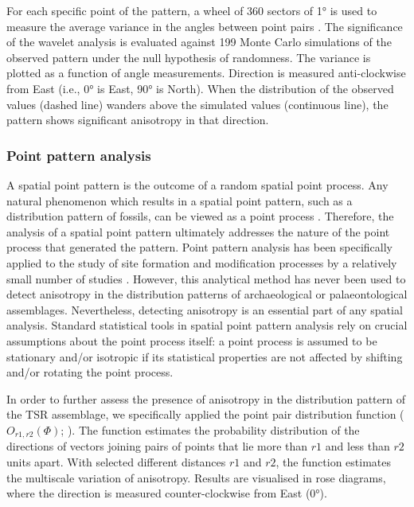 \documentclass[review,times,authoryear]{elsarticle} %
\begin{document}
For each specific point of the pattern, a wheel of 360 sectors of 1° is used to measure the average variance in the angles between point pairs \citep{Rosenberg2004}. The significance of the wavelet analysis is evaluated against 199 Monte Carlo simulations of the observed pattern under the null hypothesis of randomness. The variance is plotted as a function of angle measurements. Direction is measured anti-clockwise from East (i.e., 0° is East, 90° is North). When the distribution of the observed values (dashed line) wanders above the simulated values (continuous line), the pattern shows significant anisotropy in that direction.

\subsubsection{Point pattern analysis}

A spatial point pattern is the outcome of a random spatial point process. Any natural phenomenon which results in a spatial point pattern, such as a distribution pattern of fossils, can be viewed as a point process \citep{spatstatBook}. Therefore, the analysis of a spatial point pattern ultimately addresses the nature of the point process that generated the pattern. Point pattern analysis has been specifically applied to the study of site formation and modification processes by a relatively small number of studies \citep{Lenoble2008,Dominguez-Rodrigo2014b,Dominguez-Rodrigo2014c,Dominguez-Rodrigo2017,Giusti2016,Giusti,Organista2017}. However, this analytical method has never been used to detect anisotropy in the distribution patterns of archaeological or palaeontological assemblages. Nevertheless, detecting anisotropy is an essential part of any spatial analysis. Standard statistical tools in spatial point pattern analysis rely on crucial assumptions about the point process itself: a point process is assumed to be stationary and/or isotropic if its statistical properties are not affected by shifting and/or rotating the point process.

In order to further assess the presence of anisotropy in the distribution pattern of the TSR assemblage, we specifically applied the point pair distribution function ($O_{r1,r2}(\Phi)$; \citealp{spatstatBook}). The function estimates the probability distribution of the directions of vectors joining pairs of points that lie more than $r1$ and less than $r2$ units apart. With selected different distances $r1$ and $r2$, the function estimates the multiscale variation of anisotropy. Results are visualised in rose diagrams, where the direction is measured counter-clockwise from East (0°).
\end{document}
